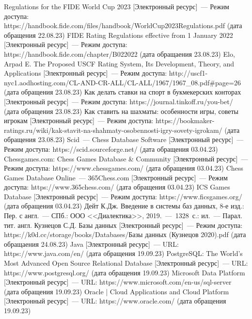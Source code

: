 \begin{thebibliography}{}
	 Regulations for the FIDE World Cup 2023 [Электронный ресурс]~--- Режим доступа: https://handbook.fide.com/files/handbook/WorldCup2023Regulations.pdf (дата обращения 22.08.23)
	 FIDE Rating Regulations effective from 1 January 2022 [Электронный ресурс]~--- Режим доступа: https://handbook.fide.com/chapter/B022022 (дата обращаения 23.08.23)
	 Elo, Arpad E. The Proposed USCF Rating System, Its Development, Theory, and Applications [Электронный ресурс]~--- Режим доступа: http://uscf1-nyc1.aodhosting.com/CL-AND-CR-ALL/CL-ALL/1967/1967\_08.pdf\#page=26 (дата обращения 23.08.23)
	 Как делать ставки на спорт в букмекерских конторах [Электронный ресурс]~--- Режим доступа: https://journal.tinkoff.ru/you-bet/ (дата обращения 23.08.23)
	 Как ставить на шахматы: особенности игры, советы игрокам [Электронный ресурс]~--- Режим доступа: https://bookmaker-ratings.ru/wiki/kak-stavit-na-shahmaty-osobennosti-igry-sovety-igrokam/ (дата обращения 23.08.23)
	 Scid~--- Chess Database Software [Электронный ресурс]~--- Режим доступа: https://scid.sourceforge.net/ (дата обращения 03.04.23)
	 Chessgames.com: Chess Games Database \& Community [Электронный ресурс]~--- Режим доступа: https://www.chessgames.com/ (дата обращения 03.04.23)
	 Chess Games Database Online~--- 365Chess.com [Электронный ресурс]~--- Режим доступа: https://www.365chess.com/ (дата обращения 03.04.23)
	 ICS Games Database [Электронный ресурс]~--- Режим доступа: https://www.ficsgames.org/ (дата обращения 03.04.23)
	 Дейт К.Дж. Введение в системы баз данных, 8-е изд.: Пер. с англ.~--- СПб.: ООО <<Диалектика>>, 2019.~---~1328~с.: ил.~--- Парал. тит. англ.
	 Кузнецов С.Д. Базы данных [Электронный ресурс]~--- Режим доступа: https://k0d.cc/storage/books/Databases/Базы данных (Кузнецов 2020).pdf (дата обращаения 24.08.23)
	 Java [Электронный ресурс]~--- URL: https://www.java.com/en/ (дата обращения 19.09.23)
	 PostgreSQL: The World's Most Advanced Open Source Relational Database [Электронный ресурс]~--- URL: https://www.postgresql.org/ (дата обращения 19.09.23)
	 Microsoft Data Platform [Электронный ресурс]~--- URL: https://www.microsoft.com/en-us/sql-server (дата обращения 19.09.23)
	 Oracle | Cloud Applications and Cloud Platform [Электронный ресурс]~--- URL: https://www.oracle.com/ (дата обращения 19.09.23)

\end{thebibliography}
